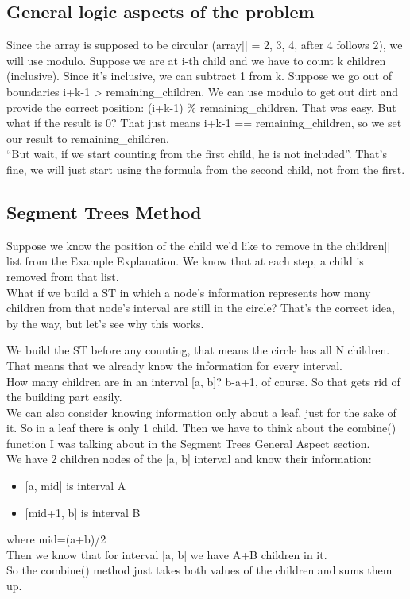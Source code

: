 \documentclass{article}
\begin{document}
\subsection{General logic aspects of the problem}
Since  the  array  is  supposed  to  be  circular  (array[]  =  {2,  3,  4},  after  4  follows  2),    we  will  use  modulo.  Suppose  we  are  at  i-th  child  and  we  have  to  count  k  children  (inclusive).  Since  it’s  inclusive,  we  can  subtract  1  from  k.  Suppose  we  go  out  of  boundaries  i+k-1  >  remaining\_children.  We  can  use  modulo  to  get  out  dirt  and  provide  the  correct  position:  (i+k-1)  \%  remaining\_children.  That  was  easy.  But  what  if  the  result  is  0?  That  just  means  i+k-1  ==  remaining\_children,  so  we  set  our  result  to  remaining\_children.    
\\“But  wait,  if  we  start  counting  from  the  first  child,  he  is  not  included”.  That’s  fine,  we  will  just  start  using  the  formula  from  the  second  child,  not  from  the  first. 

\subsection{Segment Trees Method}
Suppose  we  know  the  position  of  the  child  we’d  like  to  remove  in  the  children[]  list  from  the  Example  Explanation.  We  know  that  at  each  step,  a  child  is  removed  from  that  list.  
\\What  if  we  build  a  ST  in  which  a  node’s  information  represents  how  many  children  from  that  node’s  interval  are  still  in  the  circle?  That’s  the  correct  idea,  by  the  way,  but  let’s  see  why  this  works.  

We  build  the  ST  before  any  counting,  that  means  the  circle  has  all  N  children.  
\\That  means  that  we  already  know  the  information  for  every  interval.  
\\How  many  children  are  in  an  interval  [a,  b]?  b-a+1,  of  course.  So  that  gets  rid  of  the  building  part  easily.  \\We  can  also  consider  knowing  information  only  about  a  leaf,  just  for  the  sake  of  it.  So  in  a  leaf  there  is  only  1  child.  Then  we  have  to  think  about  the  combine()  function  I  was  talking  about  in  the  Segment Trees General Aspect section.  
\\We  have  2  children  nodes  of  the  [a,  b]  interval  and  know  their  information:  
\begin{itemize}
    \item $[$a,  mid$]$ is interval A
    \item $[$mid+1,  b$]$ is interval B
\end{itemize}
where  mid=(a+b)/2  
\\Then  we  know  that  for  interval  [a,  b]  we  have  A+B  children  in  it.  
\\So  the  combine()  method  just  takes  both  values  of  the  children  and  sums  them  up.
\end{document}
